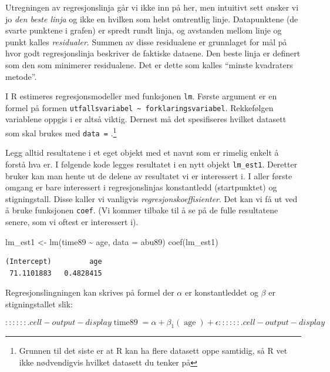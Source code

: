 \documentclass[
  letterpaper,
  DIV=11,
  numbers=noendperiod]{scrreprt}
\newenvironment{Shaded}{\begin{snugshade}}{\end{snugshade}}
\newcommand{\AttributeTok}[1]{\textcolor[rgb]{0.40,0.45,0.13}{#1}}
\newcommand{\FunctionTok}[1]{\textcolor[rgb]{0.28,0.35,0.67}{#1}}
\newcommand{\NormalTok}[1]{\textcolor[rgb]{0.00,0.23,0.31}{#1}}
\newcommand{\OtherTok}[1]{\textcolor[rgb]{0.00,0.23,0.31}{#1}}
\newcommand{\SpecialCharTok}[1]{\textcolor[rgb]{0.37,0.37,0.37}{#1}}
\theoremstyle{definition}
\theoremstyle{remark}
\begin{document}
Utregningen av regresjonslinja går vi ikke inn på her, men intuitivt
sett ønsker vi jo \emph{den beste linja} og ikke en hvilken som helst
omtrentlig linje. Datapunktene (de svarte punktene i grafen) er spredt
rundt linja, og avstanden mellom linje og punkt kalles
\emph{residualer}. Summen av disse residualene er grunnlaget for mål på
hvor godt regresjonslinja beskriver de faktiske dataene. Den beste linja
er definert som den som minimerer residualene. Det er dette som kalles
``minste kvadraters metode''.

I R estimeres regresjonsmodeller med funksjonen \texttt{lm}. Første
argument er en formel på formen
\texttt{utfallsvariabel\ \textasciitilde{}\ forklaringsvariabel}.
Rekkefølgen variablene oppgis i er altså viktig. Dernest må det
spesifiseres hvilket datasett som skal brukes med \texttt{data\ =}
.\footnote{Grunnen til det siste er at R kan ha flere datasett oppe
  samtidig, så R vet ikke nødvendigvis hvilket datasett du tenker på}

Legg alltid resultatene i et eget objekt med et navnt som er rimelig
enkelt å forstå hva er. I følgende kode legges resultatet i en nytt
objekt \texttt{lm\_est1}. Deretter bruker kan man hente ut de delene av
resultatet vi er interessert i. I aller første omgang er bare
interessert i regresjonslinjas konstantledd (startpunktet) og
stigningstall. Disse kaller vi vanligvis \emph{regresjonskoeffisienter}.
Det kan vi få ut ved å bruke funksjonen \texttt{coef}. (Vi kommer
tilbake til å se på de fulle resultatene senere, som vi oftest er
interessert i).

\begin{Shaded}
\begin{Highlighting}[]
\NormalTok{lm\_est1 }\OtherTok{\textless{}{-}} \FunctionTok{lm}\NormalTok{(time89 }\SpecialCharTok{\textasciitilde{}}\NormalTok{ age, }\AttributeTok{data =}\NormalTok{ abu89)}
\FunctionTok{coef}\NormalTok{(lm\_est1)}
\end{Highlighting}
\end{Shaded}

\begin{verbatim}
(Intercept)         age 
 71.1101883   0.4828415 
\end{verbatim}

Regresjonslingningen kan skrives på formel der \(\alpha\) er
konstantleddet og \(\beta\) er stigningstallet slik:

\begin{equation}
:::

::: {.cell-output-display}
\operatorname{time89} = \alpha + \beta_{1}(\operatorname{age}) + \epsilon
:::

::: {.cell-output-display}
\end{equation}
\end{document}
